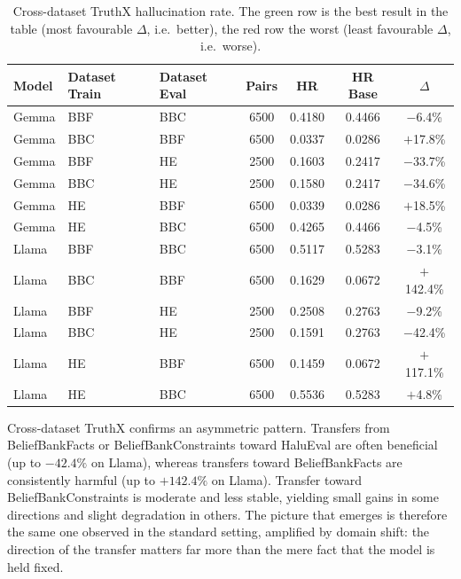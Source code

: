 \begin{table}[H]
\centering
\setlength{\tabcolsep}{4pt}
\begin{tabular}{lllcccc}
\toprule
\textbf{Model} & \textbf{Dataset Train} & \textbf{Dataset Eval} & \textbf{Pairs} & \textbf{HR} & \textbf{HR Base} & \textbf{$\Delta$} \\
\midrule
Gemma & BBF & BBC & 6500 & 0.4180 & 0.4466 & $-$6.4\% \\
Gemma & BBC & BBF & 6500 & 0.0337 & 0.0286 & $+$17.8\% \\
Gemma & BBF & HE  & 2500 & 0.1603 & 0.2417 & $-$33.7\% \\
Gemma & BBC & HE  & 2500 & 0.1580 & 0.2417 & $-$34.6\% \\
Gemma & HE  & BBF & 6500 & 0.0339 & 0.0286 & $+$18.5\% \\
Gemma & HE  & BBC & 6500 & 0.4265 & 0.4466 & $-$4.5\% \\
\midrule
Llama & BBF & BBC & 6500 & 0.5117 & 0.5283 & $-$3.1\% \\
\rowcolor{red!25}Llama & BBC & BBF & 6500 & 0.1629 & 0.0672 & $+$142.4\% \\
Llama & BBF & HE  & 2500 & 0.2508 & 0.2763 & $-$9.2\% \\
\rowcolor{green!25}Llama & BBC & HE  & 2500 & 0.1591 & 0.2763 & $-$42.4\% \\
Llama & HE  & BBF & 6500 & 0.1459 & 0.0672 & $+$117.1\% \\
Llama & HE  & BBC & 6500 & 0.5536 & 0.5283 & $+$4.8\% \\
\bottomrule
\end{tabular}
\caption{Cross-dataset TruthX hallucination rate. The green row is the best result in the table (most favourable $\Delta$, i.e.\ better), the red row the worst (least favourable $\Delta$, i.e.\ worse).}
\label{tab:truthx-cross-dataset}
\end{table}

Cross-dataset TruthX confirms an asymmetric pattern. Transfers from BeliefBankFacts or BeliefBankConstraints toward HaluEval are often beneficial (up to $-42.4\%$ on Llama), whereas transfers toward BeliefBankFacts are consistently harmful (up to $+142.4\%$ on Llama). Transfer toward BeliefBankConstraints is moderate and less stable, yielding small gains in some directions and slight degradation in others. The picture that emerges is therefore the same one observed in the standard setting, amplified by domain shift: the direction of the transfer matters far more than the mere fact that the model is held fixed.

